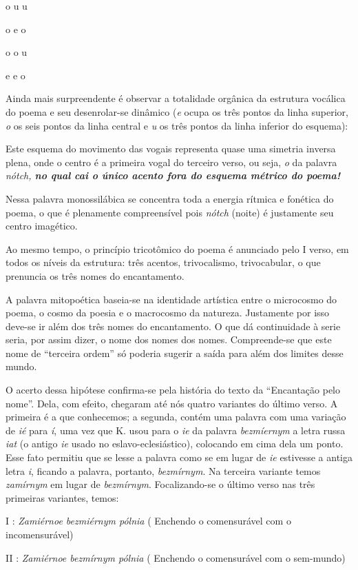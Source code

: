 o u u

o e o

o o u

e e o

Ainda mais surpreendente é observar a totalidade orgânica da estrutura
vocálica do poema e seu desenrolar-se dinâmico (\emph{e} ocupa os três
pontos da linha superior, \emph{o} os seis pontos da linha central e
\emph{u} os três pontos da linha inferior do esquema):

Este esquema do movimento das vogais representa quase uma simetria
inversa plena, onde o centro é a primeira vogal do terceiro verso, ou
seja, \emph{o} da palavra \emph{nótch, \textbf{no qual cai o único
acento fora do esquema métrico do poema!}}

Nessa palavra monossilábica se concentra toda a energia rítmica e
fonética do poema, o que é plenamente compreensível pois \emph{nótch}
(noite) é justamente seu centro imagético.

Ao mesmo tempo, o princípio tricotômico do poema é anunciado pelo I
verso, em todos os níveis da estrutura: três acentos, trivocalismo,
trivocabular, o que prenuncia os três nomes do encantamento.

A palavra mitopoética baseia-se na identidade artística entre o
microcosmo do poema, o cosmo da poesia e o macrocosmo da natureza.
Justamente por isso deve-se ir além dos três nomes do encantamento. O
que dá continuidade à serie seria, por assim dizer, o nome dos nomes dos
nomes. Compreende-se que este nome de ``terceira ordem'' só poderia
sugerir a saída para além dos limites desse mundo.

O acerto dessa hipótese confirma-se pela história do texto da
``Encantação pelo nome''. Dela, com efeito, chegaram até nós quatro
variantes do último verso. A primeira é a que conhecemos; a segunda,
contém uma palavra com uma variação de \emph{ié} para \emph{í}, uma vez
que K. usou para o \emph{{ie}} da palavra \emph{bezm{íe}rnym} a letra
russa \emph{iat} (o antigo \emph{ie} usado no eslavo-eclesiástico),
colocando em cima dela um ponto. Esse fato permitiu que se lesse a
palavra como se em lugar de \emph{{ie}} estivesse a antiga letra
\emph{i}, ficando a palavra, portanto, \emph{bezmírnym}. Na terceira
variante temos \emph{zamírnym} em lugar de \emph{bezmírnym}.
Focalizando-se o último verso nas três primeiras variantes, temos:

I : \emph{Zamiérnoe bezmiérnym pólnia} ( Enchendo o comensurável com o
incomensurável)

II : \emph{Zamiérnoe bezmírnym pólnia} ( Enchendo o comensurável com o
sem-mundo)

